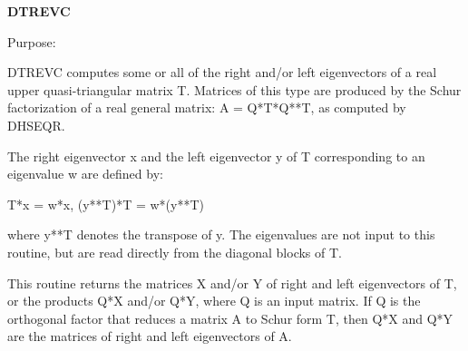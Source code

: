 {\bfseries D\+T\+R\+E\+V\+C} 

 \begin{DoxyParagraph}{Purpose\+: }
\begin{DoxyVerb} DTREVC computes some or all of the right and/or left eigenvectors of
 a real upper quasi-triangular matrix T.
 Matrices of this type are produced by the Schur factorization of
 a real general matrix:  A = Q*T*Q**T, as computed by DHSEQR.
 
 The right eigenvector x and the left eigenvector y of T corresponding
 to an eigenvalue w are defined by:
 
    T*x = w*x,     (y**T)*T = w*(y**T)
 
 where y**T denotes the transpose of y.
 The eigenvalues are not input to this routine, but are read directly
 from the diagonal blocks of T.
 
 This routine returns the matrices X and/or Y of right and left
 eigenvectors of T, or the products Q*X and/or Q*Y, where Q is an
 input matrix.  If Q is the orthogonal factor that reduces a matrix
 A to Schur form T, then Q*X and Q*Y are the matrices of right and
 left eigenvectors of A.\end{DoxyVerb}
 
\end{DoxyParagraph}

